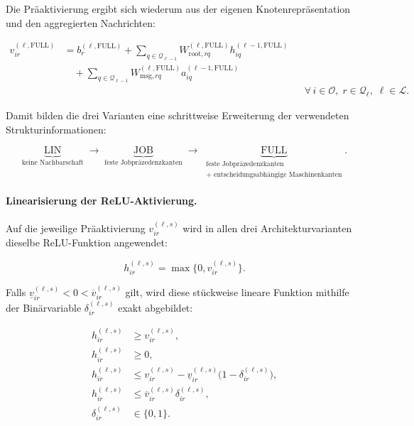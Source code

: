 Die Präaktivierung ergibt sich wiederum aus der eigenen Knotenrepräsentation
und den aggregierten Nachrichten:

\begin{align}
v_{ir}^{(\ell,\mathrm{FULL})}
&=
b_r^{(\ell,\mathrm{FULL})}
+
\sum_{q\in\mathcal{Q}_{\ell-1}}
W_{\mathrm{root},rq}^{(\ell,\mathrm{FULL})}
h_{iq}^{(\ell-1,\mathrm{FULL})}
\nonumber\\
&\quad+
\sum_{q\in\mathcal{Q}_{\ell-1}}
W_{\mathrm{msg},rq}^{(\ell,\mathrm{FULL})}
a_{iq}^{(\ell-1,\mathrm{FULL})}
\nonumber\\
&&&
\forall\,i\in\mathcal{O},\;
r\in\mathcal{Q}_\ell,\;
\ell\in\mathcal{L}.
\label{eq:gnn-full-layer}
\end{align}

Damit bilden die drei Varianten eine schrittweise Erweiterung der verwendeten
Strukturinformationen:

\[
\underbrace{\mathrm{LIN}}_{\text{keine Nachbarschaft}}
\;\longrightarrow\;
\underbrace{\mathrm{JOB}}_{\text{feste Jobpräzedenzkanten}}
\;\longrightarrow\;
\underbrace{\mathrm{FULL}}_{
  \substack{\text{feste Jobpräzedenzkanten}\\
            +\text{ entscheidungsabhängige Maschinenkanten}}
}.
\]

\paragraph{Linearisierung der ReLU-Aktivierung.}

Auf die jeweilige Präaktivierung $v_{ir}^{(\ell,s)}$ wird in allen drei
Architekturvarianten dieselbe ReLU-Funktion angewendet:

\begin{equation}
h_{ir}^{(\ell,s)}
=
\max\{0,v_{ir}^{(\ell,s)}\}.
\label{eq:gnn-relu-definition}
\end{equation}

Falls
$\underline{v}_{ir}^{(\ell,s)}<0<\overline{v}_{ir}^{(\ell,s)}$ gilt, wird
diese stückweise lineare Funktion mithilfe der Binärvariable
$\delta_{ir}^{(\ell,s)}$ exakt abgebildet:

\begin{align}
h_{ir}^{(\ell,s)}
&\ge v_{ir}^{(\ell,s)},
\label{eq:gnn-relu-lb-pre}\\
h_{ir}^{(\ell,s)}
&\ge 0,
\label{eq:gnn-relu-lb-zero}\\
h_{ir}^{(\ell,s)}
&\le
v_{ir}^{(\ell,s)}
-\underline{v}_{ir}^{(\ell,s)}
\bigl(1-\delta_{ir}^{(\ell,s)}\bigr),
\label{eq:gnn-relu-ub-active}\\
h_{ir}^{(\ell,s)}
&\le
\overline{v}_{ir}^{(\ell,s)}\delta_{ir}^{(\ell,s)},
\label{eq:gnn-relu-ub-inactive}\\
\delta_{ir}^{(\ell,s)}
&\in\{0,1\}.
\label{eq:gnn-relu-binary}
\end{align}

